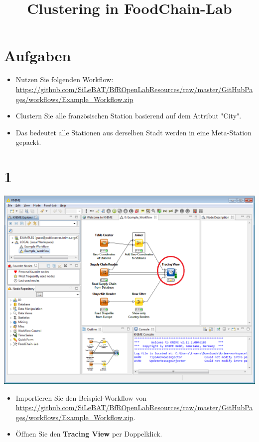 \documentclass{beamer}
\title{Clustering in FoodChain-Lab}
\date{}
\begin{document}
\maketitle

\section{Aufgaben}
\begin{frame}
	\begin{itemize}
		\item Nutzen Sie folgenden Workflow: \url{https://github.com/SiLeBAT/BfROpenLabResources/raw/master/GitHubPages/workflows/Example_Workflow.zip}
		\item Clustern Sie alle französischen Station basierend auf dem Attribut "City".
		\item Das bedeutet alle Stationen aus derselben Stadt werden in eine Meta-Station gepackt.
	\end{itemize}
\end{frame}
 
\section{1}
\begin{frame}
	\begin{center}
  		\includegraphics[height=0.6\textheight]{1.png}
	\end{center}
	\begin{itemize}
		\item Importieren Sie den Beispiel-Workflow von \url{https://github.com/SiLeBAT/BfROpenLabResources/raw/master/GitHubPages/workflows/Example_Workflow.zip}.
		\item Öffnen Sie den \textbf{Tracing View} per Doppelklick.
	\end{itemize}
\end{frame}
\end{document}
